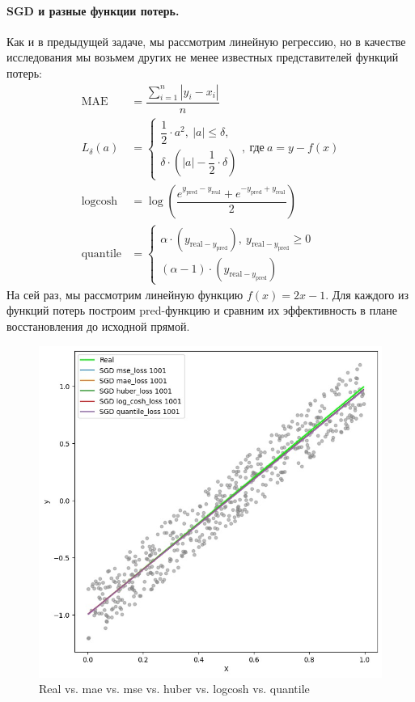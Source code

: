 \documentclass[12pt, a4paper, oneside, final]{article}
\begin{document}
	\paragraph{SGD и разные функции потерь.}
	Как и в предыдущей задаче, мы рассмотрим линейную регрессию, но в качестве исследования мы возьмем других не менее известных представителей функций потерь:
	\begin{align*}
		\text{MAE} &= \dfrac{\sum\limits_{i = 1}^{n}{|y_{i} - x_{i}|}}{n} \\
		L_{\delta}(a) &=
		\begin{cases}
			\dfrac{1}{2} \cdot a^{2}, ~ |a| \leqslant \delta, \\
			\delta \cdot \left(|a| - \dfrac{1}{2} \cdot \delta\right)
		\end{cases}, ~ \text{где} ~ a = y - f(x) \\
		\text{logcosh} &= \log{\left(\dfrac{e^{y_{\text{pred}} - y_{\text{real}}} + e^{-y_{\text{pred}} + y_{\text{real}}}}{2}\right)} \\
		\text{quantile} &=
		\begin{cases}
			\alpha \cdot (y_{\text{real} - y_{\text{pred}}}), ~ y_{\text{real} - y_{\text{pred}}} \geqslant 0 \\
			(\alpha - 1) \cdot (y_{\text{real} - y_{\text{pred}}})
		\end{cases}
	\end{align*}
	 На сей раз, мы рассмотрим линейную функцию $f(x) = 2x - 1$.
	 Для каждого из функций потерь построим pred-функцию и сравним их эффективность в плане восстановления до исходной прямой.
	\begin{figure}[H]
		\centering
		\includegraphics[scale = 0.6]{Image/T1_SGD_with_LOSS_FUNCTIONS.jpeg}
		\caption*{Real vs. mae vs. mse vs. huber vs. logcosh vs. quantile}
	\end{figure}
\end{document}
